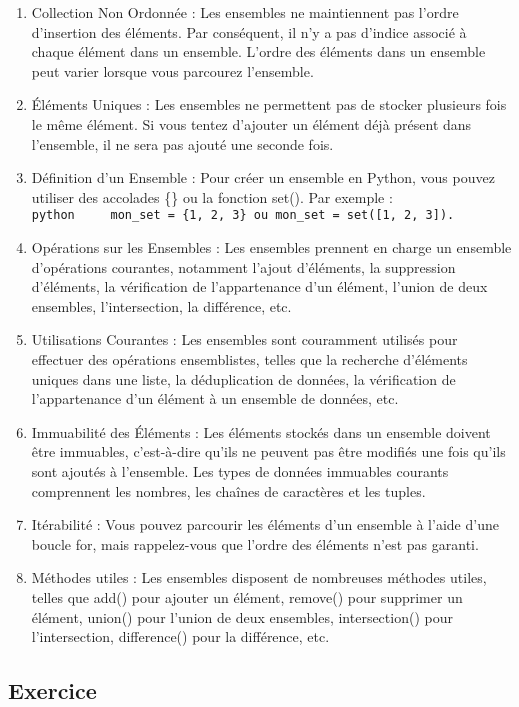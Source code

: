 \documentclass[11pt]{article}
\begin{document}
\begin{enumerate}
\def\labelenumi{\arabic{enumi}.}
\item
  Collection Non Ordonnée : Les ensembles ne maintiennent pas l'ordre
  d'insertion des éléments. Par conséquent, il n'y a pas d'indice
  associé à chaque élément dans un ensemble. L'ordre des éléments dans
  un ensemble peut varier lorsque vous parcourez l'ensemble.
\item
  Éléments Uniques : Les ensembles ne permettent pas de stocker
  plusieurs fois le même élément. Si vous tentez d'ajouter un élément
  déjà présent dans l'ensemble, il ne sera pas ajouté une seconde fois.
\item
  Définition d'un Ensemble : Pour créer un ensemble en Python, vous
  pouvez utiliser des accolades \{\} ou la fonction set(). Par exemple :
  \texttt{python\ \ \ \ \ mon\_set\ =\ \{1,\ 2,\ 3\}\ ou\ mon\_set\ =\ set({[}1,\ 2,\ 3{]}).}
\item
  Opérations sur les Ensembles : Les ensembles prennent en charge un
  ensemble d'opérations courantes, notamment l'ajout d'éléments, la
  suppression d'éléments, la vérification de l'appartenance d'un
  élément, l'union de deux ensembles, l'intersection, la différence,
  etc.
\item
  Utilisations Courantes : Les ensembles sont couramment utilisés pour
  effectuer des opérations ensemblistes, telles que la recherche
  d'éléments uniques dans une liste, la déduplication de données, la
  vérification de l'appartenance d'un élément à un ensemble de données,
  etc.
\item
  Immuabilité des Éléments : Les éléments stockés dans un ensemble
  doivent être immuables, c'est-à-dire qu'ils ne peuvent pas être
  modifiés une fois qu'ils sont ajoutés à l'ensemble. Les types de
  données immuables courants comprennent les nombres, les chaînes de
  caractères et les tuples.
\item
  Itérabilité : Vous pouvez parcourir les éléments d'un ensemble à
  l'aide d'une boucle for, mais rappelez-vous que l'ordre des éléments
  n'est pas garanti.
\item
  Méthodes utiles : Les ensembles disposent de nombreuses méthodes
  utiles, telles que add() pour ajouter un élément, remove() pour
  supprimer un élément, union() pour l'union de deux ensembles,
  intersection() pour l'intersection, difference() pour la différence,
  etc.
\end{enumerate}

    \hypertarget{exercice}{%
\subsection{Exercice}\label{exercice}}
\end{document}
